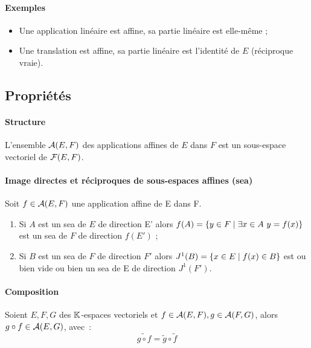 \paragraph{Exemples}
\begin{itemize}
    \item Une application linéaire est affine, sa partie linéaire est elle-même ;
    \item Une translation est affine, sa partie linéaire est l'identité de $E$
        (réciproque vraie).
\end{itemize}
\subsection{Propriétés}

\paragraph{Structure}
\begin{prop}
    L'ensemble $\mathcal{A}(E,F)$ des applications affines de $E$ dans $F$ est un
    sous-espace vectoriel de $\mathcal{F}(E,F)$.
\end{prop}

\paragraph{Image directes et réciproques de sous-espaces affines (sea)}
\begin{prop}
	Soit $f \in \mathcal{A}(E, F)$ une application affine de E dans F.
	\begin{enumerate}
		\item Si $A$ est un sea de $E$ de direction E' alors $f(A) = \left\{y \in F\mathrel{}\middle|\mathrel{}\exists x \in A \ y= f(x)\right\}$ est un sea de $F$ de direction $f(E')$ ;
		\item Si $B$ est un sea de $F$ de direction $F'$ alors $J^{1}(B) = \left\{x \in E\mathrel{}\middle|\mathrel{}f(x) \in B\right\}$ est ou bien vide ou bien un sea de E de direction $J^{1}(F')$.
	\end{enumerate}
\end{prop}

\paragraph{Composition}
\begin{prop}
	Soient $E, F, G$ des $\mathbb{K}$-espaces vectoriels et $f \in \mathcal{A}(E, F), g \in \mathcal{A}(F, G)$, alors $g \circ f \in \mathcal{A}(E, G)$, avec~:
	\begin{equation}
		\widetilde{g \circ f} = \tilde{g} \circ \tilde{f}
	\end{equation}
\end{prop}

